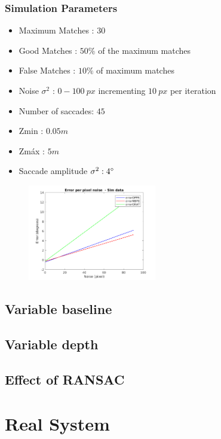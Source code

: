 \subsubsection{Simulation Parameters}
\begin{itemize}
	\item Maximum Matches : $30$
	\item Good Matches : $50 \%$ of the maximum matches
	\item False Matches : $10 \%$ of maximum matches
	\item Noise $\sigma^2$ : $0-100 \ px$ incrementing $10 \ px$ per iteration
	\item Number of saccades: $45$
	\item Zmin : $0.05 m$
	\item Zmáx : $5 m$
	\item Saccade amplitude $\sigma^2 : 4 \degree $
\end{itemize}
\begin{figure}[ht]
	\centering
	\includegraphics[width=0.5\textwidth]{images/sim/noise.png}
	\label{cha5:sec1:noise}
\end{figure}

\subsection{Variable baseline}
\subsection{Variable depth}

\subsection{Effect of RANSAC}

\section{Real System}
